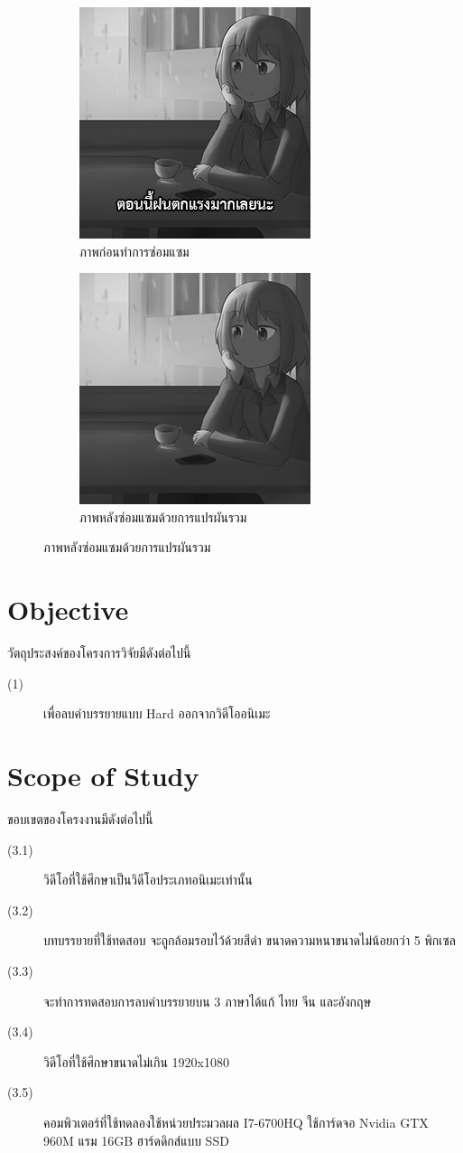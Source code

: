 \documentclass[hidelinks,a4paper,14pt]{article}
\numberwithin{equation}{section}							%
\begin{document}
{	\begin{figure}[H]
		\begin{subfigure}{0.4\linewidth}
			\centering
			\includegraphics[width=0.4\linewidth]{images/splitbergman-before.png}
			\caption{ภาพก่อนทำการซ่อมแซม}
		\end{subfigure}
		\begin{subfigure}{0.4\linewidth}
			\centering
			\includegraphics[width=0.4\linewidth]{images/splitbergman-after.png}
			\caption{ภาพหลังซ่อมแซมด้วยการแปรผันรวม}
		\end{subfigure}
	\end{figure}

\section{Objective}
วัตถุประสงค์ของโครงการวิจัยมีดังต่อไปนี้
\begin{description}
	\item[(1)] เพื่อลบคำบรรยายแบบ Hard ออกจากวิดีโออนิเมะ
\end{description}

\section{Scope of Study}
ขอบเขตของโครงงานมีดังต่อไปนี้
\begin{description}
\item[(3.1)] วิดีโอที่ใช้ศึกษาเป็นวิดีโอประเภทอนิเมะเท่านั้น
\item[(3.2)] บทบรรยายที่ใช้ทดสอบ จะถูกล้อมรอบไว้ด้วยสีดำ ขนาดความหนาขนาดไม่น้อยกว่า 5 พิกเซล
\item[(3.3)] จะทำการทดสอบการลบคำบรรยายบน 3 ภาษาได้แก้ ไทย จีน และอังกฤษ
\item[(3.4)] วิดีโอที่ใช้ศึกษาขนาดไม่เกิน 1920x1080
\item[(3.5)] คอมพิวเตอร์ที่ใช้ทดลองใช้หน่วยประมวลผล I7-6700HQ ใช้การ์ดจอ Nvidia GTX 960M แรม 16GB ฮาร์ดดิกส์แบบ SSD
\end{description}

}
\end{document}

